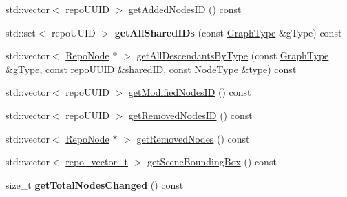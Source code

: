 \begin{DoxyCompactItemize}
\item 
std\+::vector$<$ repo\+U\+U\+I\+D $>$ \hyperlink{classrepo_1_1core_1_1model_1_1_repo_scene_a196bf70ee860e58e79cf4338e61d4aed}{get\+Added\+Nodes\+I\+D} () const 
\item 
\hypertarget{classrepo_1_1core_1_1model_1_1_repo_scene_acddce29a3142eea2ae7d16dd24688013}{}std\+::set$<$ repo\+U\+U\+I\+D $>$ {\bfseries get\+All\+Shared\+I\+Ds} (const \hyperlink{classrepo_1_1core_1_1model_1_1_repo_scene_aefcacd6eb4c7774ac1bfe3a6b223337c}{Graph\+Type} \&g\+Type) const \label{classrepo_1_1core_1_1model_1_1_repo_scene_acddce29a3142eea2ae7d16dd24688013}

\item 
std\+::vector$<$ \hyperlink{classrepo_1_1core_1_1model_1_1_repo_node}{Repo\+Node} $\ast$ $>$ \hyperlink{classrepo_1_1core_1_1model_1_1_repo_scene_a6ca791f3a220139683a483c77b117205}{get\+All\+Descendants\+By\+Type} (const \hyperlink{classrepo_1_1core_1_1model_1_1_repo_scene_aefcacd6eb4c7774ac1bfe3a6b223337c}{Graph\+Type} \&g\+Type, const repo\+U\+U\+I\+D \&shared\+I\+D, const Node\+Type \&type) const 
\item 
std\+::vector$<$ repo\+U\+U\+I\+D $>$ \hyperlink{classrepo_1_1core_1_1model_1_1_repo_scene_a38b387913f5f84bd0b6948b88b5b2a09}{get\+Modified\+Nodes\+I\+D} () const 
\item 
std\+::vector$<$ repo\+U\+U\+I\+D $>$ \hyperlink{classrepo_1_1core_1_1model_1_1_repo_scene_a5eab7b960b71528e609187848c39bec6}{get\+Removed\+Nodes\+I\+D} () const 
\item 
std\+::vector$<$ \hyperlink{classrepo_1_1core_1_1model_1_1_repo_node}{Repo\+Node} $\ast$ $>$ \hyperlink{classrepo_1_1core_1_1model_1_1_repo_scene_a59dd8d61c75867f3b42430c578bbec1f}{get\+Removed\+Nodes} () const 
\item 
std\+::vector$<$ \hyperlink{structrepo__vector__t}{repo\+\_\+vector\+\_\+t} $>$ \hyperlink{classrepo_1_1core_1_1model_1_1_repo_scene_a7de6b4892cf101adf864a4b88cc1984b}{get\+Scene\+Bounding\+Box} () const 
\item 
\hypertarget{classrepo_1_1core_1_1model_1_1_repo_scene_afbca108bafcccbf86660c424afdd1fef}{}size\+\_\+t {\bfseries get\+Total\+Nodes\+Changed} () const \label{classrepo_1_1core_1_1model_1_1_repo_scene_afbca108bafcccbf86660c424afdd1fef}


\end{DoxyCompactItemize}
